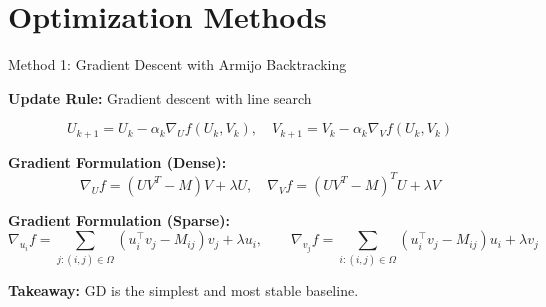 \documentclass[aspectratio=169,usenames,dvipsnames]{beamer}
\begin{document}
\section{Optimization Methods}

\begin{frame}{Method 1: Gradient Descent with Armijo Backtracking}

\textbf{Update Rule:} Gradient descent with line search

$$U_{k+1} = U_k - \alpha_k \nabla_U f(U_k, V_k), \quad 
V_{k+1} = V_k - \alpha_k \nabla_V f(U_k, V_k)$$

\vspace{0.3cm}

\textbf{Gradient Formulation (Dense):}
$$\nabla_U f = (UV^T - M)V + \lambda U, \quad
\nabla_V f = (UV^T - M)^T U + \lambda V$$

\vspace{0.3cm}
\textbf{Gradient Formulation (Sparse):}
\[
\nabla_{u_i} f
=
\sum_{j:(i,j)\in\Omega}\left(u_i^\top v_j - M_{ij}\right)v_j + \lambda u_i,
\qquad
\nabla_{v_j} f
=
\sum_{i:(i,j)\in\Omega}\left(u_i^\top v_j - M_{ij}\right)u_i + \lambda v_j
\]


\vspace{0.3cm}

\textbf{Takeaway:} GD is the simplest and most stable baseline.
\end{frame}
\end{document}
